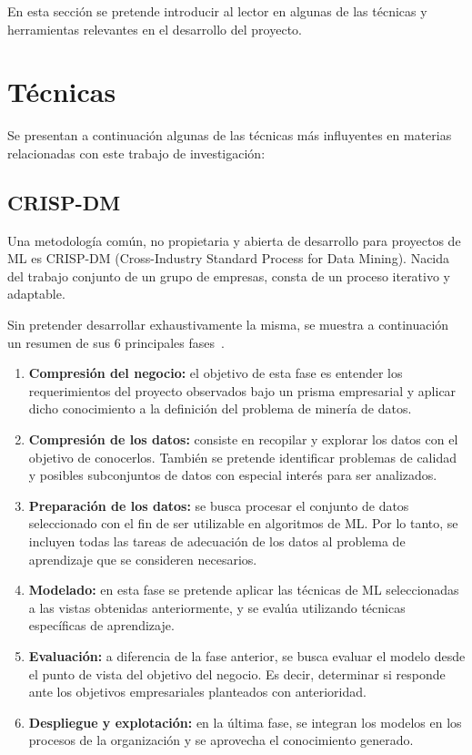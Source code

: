 
En esta sección se pretende introducir al lector en algunas de las técnicas y herramientas relevantes en el desarrollo del proyecto.

\section{Técnicas}

Se presentan a continuación algunas de las técnicas más influyentes en materias relacionadas con este trabajo de investigación:

\subsection{CRISP-DM}
Una metodología común, no propietaria y abierta de desarrollo para proyectos de ML es CRISP-DM (Cross-Industry Standard Process for Data Mining). Nacida del trabajo conjunto de un grupo de empresas, consta de un proceso iterativo y adaptable.

Sin pretender desarrollar exhaustivamente la misma, se muestra a continuación un resumen de sus 6 principales fases~\cite{apuntesSisint}.

\begin{enumerate}
	\item \textbf{Compresión del negocio:} el objetivo de esta fase es entender los requerimientos del proyecto observados bajo un prisma empresarial y aplicar dicho conocimiento a la definición del problema de minería de datos.
	
	\item \textbf{Compresión de los datos:} consiste en recopilar y explorar los datos con el objetivo de conocerlos. También se pretende identificar problemas de calidad y posibles subconjuntos de datos con especial interés para ser analizados.
	
	\item \textbf{Preparación de los datos:} se busca procesar el conjunto de datos seleccionado con el fin de ser utilizable en algoritmos de ML. Por lo tanto, se incluyen todas las tareas de adecuación de los datos al problema de aprendizaje que se consideren necesarios.
	
	\item \textbf{Modelado:} en esta fase se pretende aplicar las técnicas de ML seleccionadas a las vistas obtenidas anteriormente, y se evalúa utilizando técnicas específicas de aprendizaje. 
	
	\item \textbf{Evaluación:} a diferencia de la fase anterior, se busca evaluar el modelo desde el punto de vista del objetivo del negocio. Es decir, determinar si responde ante los objetivos empresariales planteados con anterioridad.
	
	\item \textbf{Despliegue y explotación:} en la última fase, se integran los modelos en los procesos de la organización y se aprovecha el conocimiento generado.
\end{enumerate}

